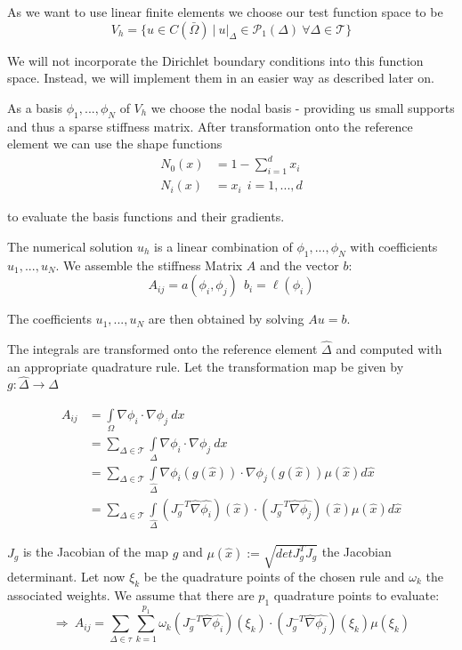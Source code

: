 \documentclass[11pt,a4paper,headinclude,footinclude,DIV16,headings=normal]{scrreprt}
\begin{document}
As we want to use linear finite elements we choose our test function space to be
\begin{equation}
 V_h = \{ u\in C(\bar{\Omega} )\ \Big| \ u\big|_{\Delta}\in\mathcal{P}_1 (\Delta ) \ \forall\Delta\in\mathcal{T}\}
\end{equation}

We will not incorporate the Dirichlet boundary conditions into this function space. Instead, we will implement them in an easier way as described later on.

As a basis $\phi_1 ,...,\phi_N$ of $V_h$ we choose the nodal basis - providing us small supports and thus a sparse stiffness matrix. After transformation onto the reference element we can use the shape functions
\begin{align}
N_0(x) & = 1 - \sum\limits_{i=1}^d x_i \\
N_i(x) & = x_i \ \ i=1,...,d
\end{align}

to evaluate the basis functions and their gradients.

The numerical solution $u_h$ is a linear combination of $\phi_1,...,\phi_N$ with coefficients $u_1,...,u_N$. We assemble the stiffness Matrix $A$ and the vector $b$:
\begin{equation}
 A_{ij}=a(\phi_i ,\phi_j ) \ \ b_i=\ell (\phi_i )
\end{equation}

The coefficients $u_1,...,u_N$ are then obtained by solving $Au=b$.

The integrals are transformed onto the reference element $\hat{\Delta}$ and computed with an appropriate quadrature rule. Let the transformation map be given by $g: \hat{\Delta} \to \Delta$

\begin{align}
 A_{ij} & = \int\limits_{\Omega}\nabla\phi_i\cdot\nabla\phi_j\ dx\\
& = \sum\limits_{\Delta\in\mathcal{T}} \int\limits_{\Delta}\nabla\phi_i\cdot\nabla\phi_j\ dx\\
& = \sum\limits_{\Delta\in\mathcal{T}} \int\limits_{\hat{\Delta}}\nabla\phi_i (g(\hat{x}))
	\cdot\nabla\phi_j (g(\hat{x}))\mu (\hat{x} )d\hat{x}\\
& = \sum\limits_{\Delta\in\mathcal{T}} \int\limits_{\hat{\Delta}} (J_g^{-T}\hat{\nabla}\hat{\phi_i} )(\hat{x} )
	\cdot (J_g^{-T}\hat{\nabla}\hat{\phi_j} )(\hat{x} )\mu (\hat{x} )d\hat{x}
\end{align}

$J_g$ is the Jacobian of the map $g$ and $\mu (\hat{x}):=\sqrt{det J_g^{T} J_g}$ the Jacobian determinant. Let now $\xi_k$ be the quadrature points  of the chosen rule and $\omega_k$ the associated weights. We assume that there are $p_1$ quadrature points to evaluate:
\begin{equation}
\label{equ:computea}
 \Rightarrow \ A_{ij} = \sum\limits_{\Delta\in\tau} \sum\limits_{k=1}^{p_1}
\omega_k(J_g^{-T}\hat{\nabla}\hat{\phi_i} )(\xi_k )
\cdot (J_g^{-T}\hat{\nabla}\hat{\phi_j} )(\xi_k )\mu (\xi_k )
\end{equation}
\end{document}
